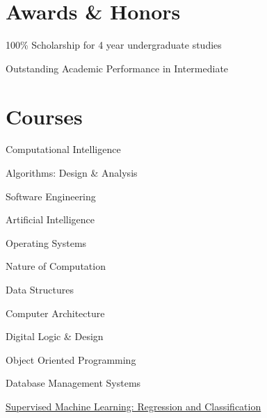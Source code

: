 \documentclass[]{resume}
\begin{document}
\begin{minipage}[t]{0.39\textwidth}


\section{Awards \& Honors}
 
    \begin{tightemize}
        \item 100\% Scholarship for 4 year undergraduate studies
    \end{tightemize}
 
    \begin{tightemize}
        \item Outstanding Academic Performance in Intermediate
    \end{tightemize}



\section{Courses}
\begin{tightemize}
\sectionsep
    \item Computational Intelligence
    \item Algorithms: Design \& Analysis
    \item Software Engineering
    \item Artificial Intelligence
    \item Operating Systems
    \item Nature of Computation
    \item Data Structures
    \item Computer Architecture
    \item Digital Logic \& Design
    \item Object Oriented Programming
    \item Database Management Systems
\end{tightemize}
\begin{tightemize}
    \item \href{https://www.coursera.org/account/accomplishments/certificate/UU97RJ8QGMGN}{Supervised Machine Learning: Regression and Classification}
\end{tightemize}


\end{minipage}
\end{document}
